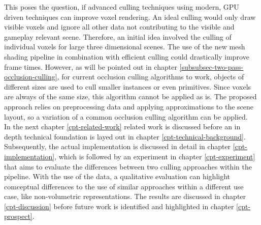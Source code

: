 \noindent
This poses the question, if advanced culling techniques using modern, \ac{GPU} driven techniques can 
improve voxel rendering. An ideal culling would only draw visible voxels and ignore all other data 
not contributing to the visible and gameplay relevant scene. Therefore, an initial idea involved 
the culling of individual voxels for large three dimensional scenes. The use of the new mesh shading 
pipeline in combination with efficient culling could drastically improve frame times. However, as will be 
pointed out in chapter \ref{subsubsec-two-pass-occlusion-culling}, for current occlusion culling 
algorithms to work, objects of different sizes are used to cull smaller instances or even primitives.
Since voxels are always of the same size, this algorithm cannot be applied as is. The proposed approach 
relies on preprocessing data and applying approximations to the scene layout, so a variation of a 
common occlusion culling algorithm can be applied. \\

\noindent
In the next chapter \ref{cpt-related-work} related work is discussed before an in depth technical foundation 
is layed out in chapter \ref{cpt-technical-background}. Subsequently, the actual implementation is discussed 
in detail in chapter \ref{cpt-implementation}, which is followed by an experiment in chapter \ref{cpt-experiment} 
that aims to evaluate the differences between two culling approaches within the pipeline. With the use of the data, 
a qualitative evaluation can highlight comceptual differences to the use of similar approaches within a different 
use case, like non-volumetric representations. The results are discussed in chapter \ref{cpt-discussion} before 
future work is identified and highlighted in chapter \ref{cpt-prospect}. 
